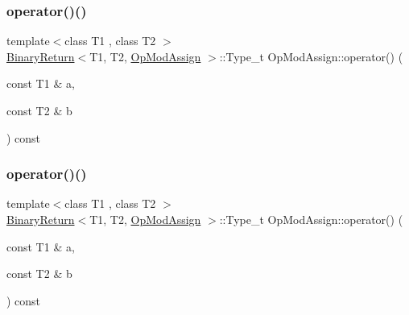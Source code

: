 \subsubsection{\texorpdfstring{operator()()}{operator()()}\hspace{0.1cm}{\footnotesize\ttfamily [1/3]}}
{\footnotesize\ttfamily template$<$class T1 , class T2 $>$ \\
\mbox{\hyperlink{structBinaryReturn}{Binary\+Return}}$<$T1, T2, \mbox{\hyperlink{structOpModAssign}{Op\+Mod\+Assign}} $>$\+::Type\+\_\+t Op\+Mod\+Assign\+::operator() (\begin{DoxyParamCaption}\item[{const T1 \&}]{a,  }\item[{const T2 \&}]{b }\end{DoxyParamCaption}) const\hspace{0.3cm}{\ttfamily [inline]}}

\mbox{\label{structOpModAssign_ae4cd6a2eeb0dd164ae1f38821fd596d6}} 
\subsubsection{\texorpdfstring{operator()()}{operator()()}\hspace{0.1cm}{\footnotesize\ttfamily [2/3]}}
{\footnotesize\ttfamily template$<$class T1 , class T2 $>$ \\
\mbox{\hyperlink{structBinaryReturn}{Binary\+Return}}$<$T1, T2, \mbox{\hyperlink{structOpModAssign}{Op\+Mod\+Assign}} $>$\+::Type\+\_\+t Op\+Mod\+Assign\+::operator() (\begin{DoxyParamCaption}\item[{const T1 \&}]{a,  }\item[{const T2 \&}]{b }\end{DoxyParamCaption}) const\hspace{0.3cm}{\ttfamily [inline]}}

\mbox{\label{structOpModAssign_ae4cd6a2eeb0dd164ae1f38821fd596d6}} 
